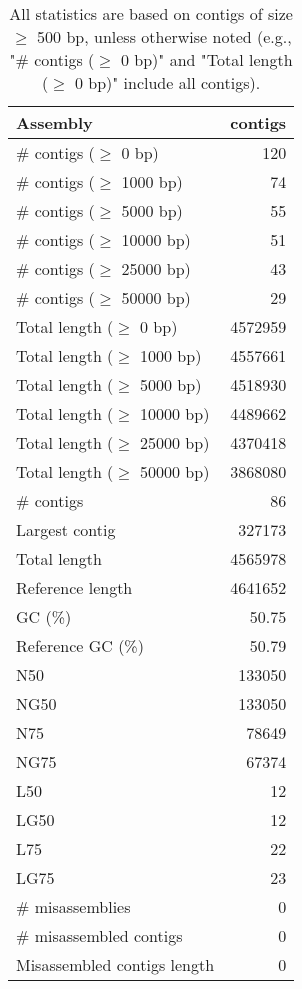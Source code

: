 \documentclass[12pt,a4paper]{article}
\begin{document}
\begin{table}[ht]
\begin{center}
\caption{All statistics are based on contigs of size $\geq$ 500 bp, unless otherwise noted (e.g., "\# contigs ($\geq$ 0 bp)" and "Total length ($\geq$ 0 bp)" include all contigs).}
\begin{tabular}{|l*{1}{|r}|}
\hline
Assembly & contigs \\ \hline
\# contigs ($\geq$ 0 bp) & 120 \\ \hline
\# contigs ($\geq$ 1000 bp) & 74 \\ \hline
\# contigs ($\geq$ 5000 bp) & 55 \\ \hline
\# contigs ($\geq$ 10000 bp) & 51 \\ \hline
\# contigs ($\geq$ 25000 bp) & 43 \\ \hline
\# contigs ($\geq$ 50000 bp) & 29 \\ \hline
Total length ($\geq$ 0 bp) & 4572959 \\ \hline
Total length ($\geq$ 1000 bp) & 4557661 \\ \hline
Total length ($\geq$ 5000 bp) & 4518930 \\ \hline
Total length ($\geq$ 10000 bp) & 4489662 \\ \hline
Total length ($\geq$ 25000 bp) & 4370418 \\ \hline
Total length ($\geq$ 50000 bp) & 3868080 \\ \hline
\# contigs & 86 \\ \hline
Largest contig & 327173 \\ \hline
Total length & 4565978 \\ \hline
Reference length & 4641652 \\ \hline
GC (\%) & 50.75 \\ \hline
Reference GC (\%) & 50.79 \\ \hline
N50 & 133050 \\ \hline
NG50 & 133050 \\ \hline
N75 & 78649 \\ \hline
NG75 & 67374 \\ \hline
L50 & 12 \\ \hline
LG50 & 12 \\ \hline
L75 & 22 \\ \hline
LG75 & 23 \\ \hline
\# misassemblies & 0 \\ \hline
\# misassembled contigs & 0 \\ \hline
Misassembled contigs length & 0 \\ \hline

\end{tabular}
\end{center}
\end{table}
\end{document}
